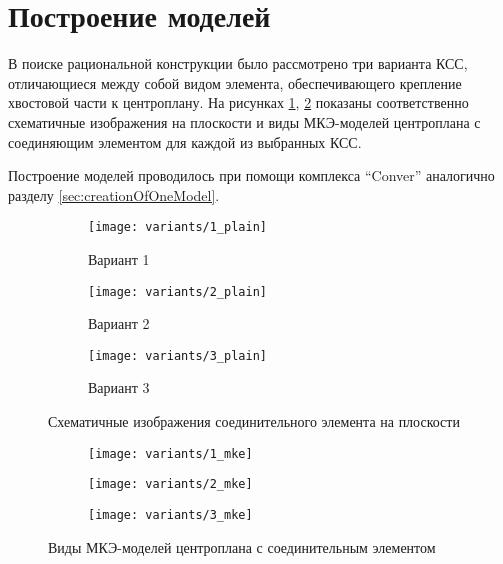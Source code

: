 \section{Построение моделей}

В поиске рациональной конструкции было рассмотрено три варианта КСС, отличающиеся между собой видом элемента, обеспечивающего крепление хвостовой части к центроплану. На рисунках \ref{fig:variants_plain}, \ref{fig:variants_mke} показаны соответственно схематичные изображения на плоскости и виды МКЭ-моделей центроплана с соединяющим элементом для каждой из выбранных КСС. 

Построение моделей проводилось при помощи комплекса ``Conver'' аналогично разделу \ref{sec:creationOfOneModel}.

\begin{figure}[H]
\centering
\begin{subfigure}[b]{0.32\textwidth}
\centering
	\texttt{[image: variants/1\_plain]}
	\caption{Вариант 1}
\end{subfigure}
\hspace{\fill}
\begin{subfigure}[b]{0.32\textwidth}
\centering
	\texttt{[image: variants/2\_plain]}
	\caption{Вариант 2}
\end{subfigure}
\hspace{\fill}
\begin{subfigure}[b]{0.32\textwidth}
\centering
	\texttt{[image: variants/3\_plain]}
	\caption{Вариант 3}
\end{subfigure}
\hspace{\fill}
\caption{Схематичные изображения соединительного элемента на плоскости}
\label{fig:variants_plain}
\end{figure}	


\begin{figure}[H]
\centering
\begin{subfigure}[b]{0.32\textwidth}
	\texttt{[image: variants/1\_mke]}
\end{subfigure}
\hspace{\fill}
\begin{subfigure}[b]{0.32\textwidth}
	\texttt{[image: variants/2\_mke]}
\end{subfigure}
\hspace{\fill}
\begin{subfigure}[b]{0.32\textwidth}
	\texttt{[image: variants/3\_mke]}
\end{subfigure}
\hspace{\fill}
\caption{Виды МКЭ-моделей центроплана с соединительным элементом}
\label{fig:variants_mke}
\end{figure}	